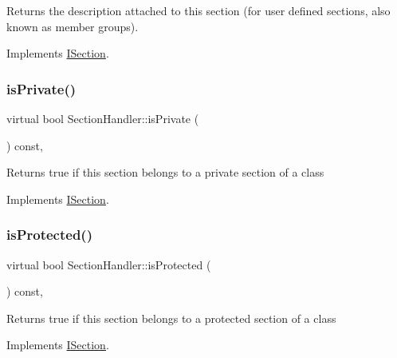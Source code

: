 Returns the description attached to this section (for user defined sections, also known as member groups). 

Implements \mbox{\hyperlink{class_i_section_a7ebb511c977fa668611481272c97e23d}{I\+Section}}.

\mbox{\label{class_section_handler_a9539ef23b026485059539a38f77ba63a}} 
\subsubsection{\texorpdfstring{isPrivate()}{isPrivate()}}
{\footnotesize\ttfamily virtual bool Section\+Handler\+::is\+Private (\begin{DoxyParamCaption}{ }\end{DoxyParamCaption}) const\hspace{0.3cm}{\ttfamily [inline]}, {\ttfamily [virtual]}}

Returns {\ttfamily true} if this section belongs to a private section of a class 

Implements \mbox{\hyperlink{class_i_section_ad205fa5a5150643b8275f3f4ef3759d8}{I\+Section}}.

\mbox{\label{class_section_handler_a60e5737210382b9496d9d012cbd56a13}} 
\subsubsection{\texorpdfstring{isProtected()}{isProtected()}}
{\footnotesize\ttfamily virtual bool Section\+Handler\+::is\+Protected (\begin{DoxyParamCaption}{ }\end{DoxyParamCaption}) const\hspace{0.3cm}{\ttfamily [inline]}, {\ttfamily [virtual]}}

Returns {\ttfamily true} if this section belongs to a protected section of a class 

Implements \mbox{\hyperlink{class_i_section_afdd0506cd65ce59c8fecc060ef813592}{I\+Section}}.

\mbox{\label{class_section_handler_aa6e571779cffbb8337fcbc041d486f63}} 
